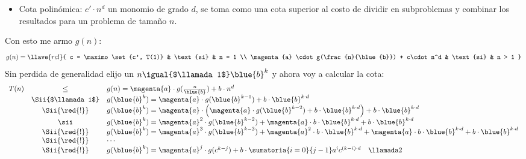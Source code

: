 \begin{enumerate}[label=\tiny\purple{\faIcon{snowman}}]
\begin{itemize}
          \item Cota polinómica: $c' \cdot n^d$ un monomio de grado $d$, se toma como una cota superior al costo de dividir
                en subproblemas y combinar los resultados para un problema de tamaño $n$.
        \end{itemize}
        Con esto me armo $g(n)$:
        $$
          g(n) =
          \llave{rcl}{
            c = \maximo\set{c', T(1)} & \text{si} & n = 1 \\
            \magenta{a} \cdot g(\frac{n}{\blue{b}}) + c\cdot n^d & \text{si} & n > 1
          }
        $$
        Sin perdida de generalidad elijo un $n \igual{$\llamada1$} \blue{b}^k$ y ahora voy a calcular la cota:
        $$
          \begin{array}{rcl}
            T(n) & \leq              & g(n)  =  \magenta{a} \cdot g(\frac{n}{\blue{b}}) + b \cdot n^d                                                       \\
                 & \Sii{$\llamada1$} &
            g(\blue{b}^k) = \magenta{a} \cdot g(\blue{b}^{k-1}) + b \cdot \blue{b}^{k \cdot d}                                                              \\
                 & \Sii{\red{!}}     &
            g(\blue{b}^k) = \magenta{a} \cdot \Big( \magenta{a} \cdot g(\blue{b}^{k-2}) + b \cdot \blue{b}^{k \cdot d} \Big) + b \cdot \blue{b}^{k \cdot d} \\
                 & \sii              &
            g(\blue{b}^k) = \magenta{a}^2 \cdot g(\blue{b}^{k-2}) + \magenta{a} \cdot b \cdot \blue{b}^{k \cdot d} + b \cdot \blue{b}^{k \cdot d}           \\
                 & \Sii{\red{!}}     &
            g(\blue{b}^k) =
            \magenta{a}^3 \cdot g(\blue{b}^{k-3}) +
            \magenta{a}^2 \cdot b \cdot \blue{b}^{k \cdot d} +
            \magenta{a} \cdot b \cdot \blue{b}^{k \cdot d} +
            b \cdot \blue{b}^{k \cdot d}                                                                                                                    \\
                 & \Sii{\red{!}}     & \cdots                                                                                                               \\
                 & \Sii{\red{!}}     &
            g(\blue{b}^k) =  \magenta{a}^j \cdot g(c^{k-j}) + b \cdot \sumatoria{i = 0}{j - 1} a^i c^{(k - i) \cdot d} \quad \llamada2
          \end{array}
        $$

\end{enumerate}
